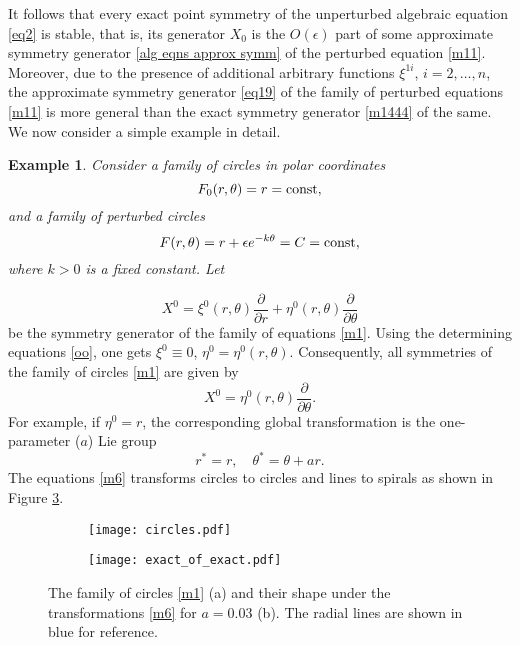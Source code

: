 \documentclass[11pt,letter,subeqn]{article}
\def\beq{\begin{equation}}
\def\eeq{\end{equation}}
\def\const{\hbox{\rm const}}
\newtheorem{example}{Example}[section]
\begin{document}
It follows that every exact point symmetry of the unperturbed algebraic equation \eqref{eq2} is stable, that is, its generator $X_0$ is the $O(\epsilon)$ part of some approximate symmetry generator \eqref{alg eqns approx symm} of the perturbed equation \eqref{m11}. Moreover, due to the presence of additional arbitrary functions
$\xi^{1i}$, $i=2,\ldots,n$, the approximate symmetry generator \eqref{eq19} of the family of perturbed equations \eqref{m11} is more general than the exact symmetry generator \eqref{m1444} of the same. We now consider a simple example in detail.

\begin{example}
Consider a family of circles in polar coordinates
\begin{equation}\label{m1}
F_0(r,\theta)=r=\const ,
\end{equation}
and a family of perturbed circles
\begin{equation}\label{m2}
F(r,\theta)= r+ \epsilon e^{-k \theta}=C=\const,
\end{equation}
where $k>0$ is a fixed constant. Let
\end{example}
\[
   X^0=\xi^0(r,\theta)\dfrac{\partial}{\partial r}+ \eta^0(r,\theta) \dfrac{\partial}{\partial \theta}
\]
be the symmetry generator of the family of equations \eqref{m1}. Using the determining equations \eqref{oo}, one gets $\xi^0\equiv 0$, $\eta^0=\eta^0(r,\theta)$. Consequently, all symmetries of the family of circles \eqref{m1} are given by
\begin{equation}\label{m3}
X^0= \eta^0(r,\theta) \dfrac{\partial}{\partial \theta}.
\end{equation}
For example, if $\eta^0=r$, the corresponding global transformation is the one-parameter ($a$) Lie group
\beq\label{m6}
  {r^*} = r, \quad  {\theta^*} = \theta+ar.
\eeq
The equations \eqref{m6} transforms circles to circles and lines to spirals as shown in Figure \ref{figure1}.
\begin{figure}[H]
\centering
\begin{subfigure}{0.4\textwidth}\label{fig:ex3-a}
	\texttt{[image: circles.pdf]}
	\caption{}
\end{subfigure}\hfill
\begin{subfigure}{.4\textwidth}\label{fig:ex3-d}
	\texttt{[image: exact\_of\_exact.pdf]}
	\caption{}
\end{subfigure}
%
\caption[]{
The family of circles \eqref{m1} (a) and their shape under the transformations \eqref{m6} for $a=0.03$ (b). The radial lines are shown in blue for reference.} %
\label{figure1}
\end{figure}
\end{document}
